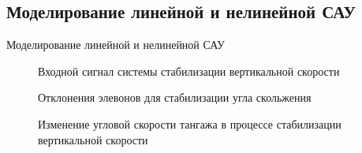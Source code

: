 \begin{center}
    \subsection{Моделирование линейной и нелинейной САУ}Моделирование линейной и нелинейной САУ
\end{center}

\begin{figure}[H]
    \caption{Входной сигнал системы стабилизации вертикальной скорости }
    \label{fig:Входной сигнал системы стабилизации вертикальной скорости}
\end{figure}

\begin{figure}[H]
    \caption{Отклонения элевонов для стабилизации угла скольжения}
    \label{fig:Отклонения элевонов для стабилизации угла скольжения}
\end{figure}

\begin{figure}[H]
    \caption{Изменение угловой скорости тангажа в процессе стабилизации вертикальной скорости}
    \label{fig:Изменение угловой скорости тангажа в процессе стабилизации вертикальной скорости}
\end{figure}

